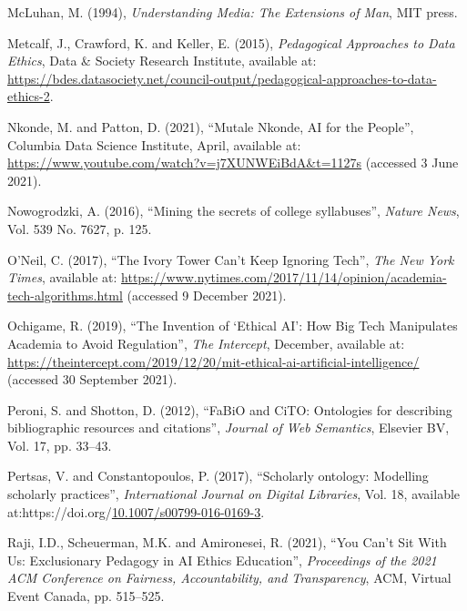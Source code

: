 \documentclass[
]{article}
\newlength{\cslhangindent}
\newlength{\cslentryspacingunit} %
\newenvironment{CSLReferences}[2] %
 {%
  \setlength{\parindent}{0pt}
  \ifodd #1
  \let\oldpar\par
  \def\par{\hangindent=\cslhangindent\oldpar}
  \fi
  \setlength{\parskip}{#2\cslentryspacingunit}
 }%
 {}
\begin{document}
\begin{CSLReferences}{1}{0}
\leavevmode{}%
McLuhan, M. (1994), \emph{Understanding Media: The Extensions of Man},
MIT press.

\leavevmode{}%
Metcalf, J., Crawford, K. and Keller, E. (2015), \emph{Pedagogical
{Approaches} to {Data} {Ethics}}, Data \& Society Research Institute,
available at:
\url{https://bdes.datasociety.net/council-output/pedagogical-approaches-to-data-ethics-2}.

\leavevmode{}%
Nkonde, M. and Patton, D. (2021), {``Mutale {Nkonde}, {AI} for the
{People}''}, Columbia Data Science Institute, April, available at:
\url{https://www.youtube.com/watch?v=j7XUNWEiBdA\&t=1127s} (accessed 3
June 2021).

\leavevmode{}%
Nowogrodzki, A. (2016), {``Mining the secrets of college syllabuses''},
\emph{Nature News}, Vol. 539 No. 7627, p. 125.

\leavevmode{}%
O'Neil, C. (2017), {``{The} {Ivory} {Tower} {Can}'t {Keep} {Ignoring}
{Tech}''}, \emph{The New York Times}, available at:
\url{https://www.nytimes.com/2017/11/14/opinion/academia-tech-algorithms.html}
(accessed 9 December 2021).

\leavevmode{}%
Ochigame, R. (2019), {``The {Invention} of {`{Ethical} {AI}'}: {How}
{Big} {Tech} {Manipulates} {Academia} to {Avoid} {Regulation}''},
\emph{The Intercept}, December, available at:
\url{https://theintercept.com/2019/12/20/mit-ethical-ai-artificial-intelligence/}
(accessed 30 September 2021).

\leavevmode{}%
Peroni, S. and Shotton, D. (2012), {``FaBiO and CiTO: Ontologies for
describing bibliographic resources and citations''}, \emph{Journal of
Web Semantics}, Elsevier BV, Vol. 17, pp. 33--43.

\leavevmode{}%
Pertsas, V. and Constantopoulos, P. (2017), {``Scholarly ontology:
Modelling scholarly practices''}, \emph{International Journal on Digital
Libraries}, Vol. 18, available
at:https://doi.org/\href{https://doi.org/10.1007/s00799-016-0169-3}{10.1007/s00799-016-0169-3}.

\leavevmode{}%
Raji, I.D., Scheuerman, M.K. and Amironesei, R. (2021), {``You {Can}'t
{Sit} {With} {Us}: {Exclusionary} {Pedagogy} in {AI} {Ethics}
{Education}''}, \emph{Proceedings of the 2021 {ACM} {Conference} on
{Fairness}, {Accountability}, and {Transparency}}, ACM, Virtual Event
Canada, pp. 515--525.


\end{CSLReferences}
\end{document}
